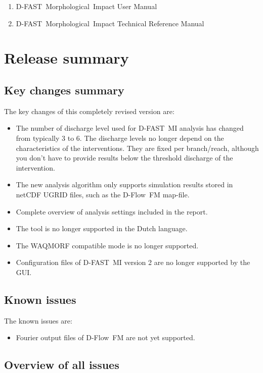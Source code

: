\documentclass[git]{deltares_manual}
\newcommand{\dfastmi}{\textrm{D-FAST~Morphological~Impact}\xspace}
\newcommand{\dfmi}{\textrm{D-FAST~MI}\xspace}
\newcommand{\dflowfm}{\textrm{D-Flow~FM}\xspace}
\begin{document}
\begin{enumerate}
\item \dfastmi User Manual
\item \dfastmi Technical Reference Manual
\end{enumerate}

\chapter{Release summary}
\section{Key changes summary}

The key changes of this completely revised version are:

\begin{itemize}
\item The number of discharge level used for \dfmi analysis has changed from typically 3 to 6.
The discharge levels no longer depend on the characteristics of the interventions.
They are fixed per branch/reach, although you don't have to provide results below the threshold discharge of the intervention.
\item The new analysis algorithm only supports simulation results stored in netCDF UGRID files, such as the \dflowfm map-file.
\item Complete overview of analysis settings included in the report.
\item The tool is no longer supported in the Dutch language.
\item The WAQMORF compatible  mode is no longer supported.
\item Configuration files of \dfmi version 2 are no longer supported by the GUI.
\end{itemize}

\section{Known issues}

The known issues are:

\begin{itemize}
\item Fourier output files of \dflowfm are not yet supported.
\end{itemize}

\section{Overview of all issues}
\end{document}

